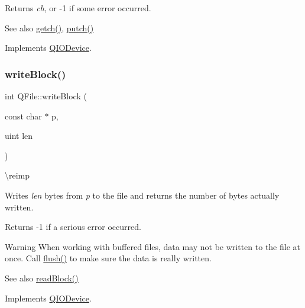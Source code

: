 Returns {\itshape ch}, or -\/1 if some error occurred.

\begin{DoxySeeAlso}{See also}
\mbox{\hyperlink{class_q_file_a1c18e1a16e6f92ba8f19177824707f78}{getch()}}, \mbox{\hyperlink{class_q_file_af331c4e27024f12383958e65c6a828a3}{putch()}} 
\end{DoxySeeAlso}


Implements \mbox{\hyperlink{class_q_i_o_device_aae3d67422103e8fc0411297b1d62c29a}{Q\+I\+O\+Device}}.

\mbox{\label{class_q_file_a47e0572e396a6e953d14ba69bf733cea}} 
\subsubsection{\texorpdfstring{writeBlock()}{writeBlock()}\hspace{0.1cm}{\footnotesize\ttfamily [1/2]}}
{\footnotesize\ttfamily int Q\+File\+::write\+Block (\begin{DoxyParamCaption}\item[{const char $\ast$}]{p,  }\item[{uint}]{len }\end{DoxyParamCaption})\hspace{0.3cm}{\ttfamily [virtual]}}

\textbackslash{}reimp

Writes {\itshape len} bytes from {\itshape p} to the file and returns the number of bytes actually written.

Returns -\/1 if a serious error occurred.

\begin{DoxyWarning}{Warning}
When working with buffered files, data may not be written to the file at once. Call \mbox{\hyperlink{class_q_file_a6d450a55bc3a8145fd33a7ee08051830}{flush()}} to make sure the data is really written.
\end{DoxyWarning}
\begin{DoxySeeAlso}{See also}
\mbox{\hyperlink{class_q_file_ab9a42e65a2fcd51bae5f2a186ff5bee5}{read\+Block()}} 
\end{DoxySeeAlso}


Implements \mbox{\hyperlink{class_q_i_o_device_a5d937df1bde2f956872dd54e077807d1}{Q\+I\+O\+Device}}.

\mbox{\label{class_q_file_a04e15f86aa48622ddb7c7e81c7cc7613}} 
